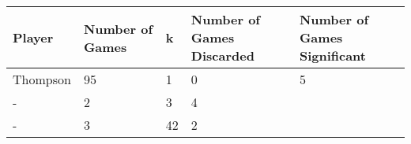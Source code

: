 \documentclass[11pt]{article}
\begin{document}
\begin{longtable}[]{@{}lllll@{}}
\toprule
\begin{minipage}[b]{0.05\columnwidth}\raggedright\strut
Player\strut
\end{minipage} & \begin{minipage}[b]{0.05\columnwidth}\raggedright\strut
Number of Games\strut
\end{minipage} & \begin{minipage}[b]{0.05\columnwidth}\raggedright\strut
k\strut
\end{minipage} & \begin{minipage}[b]{0.05\columnwidth}\raggedright\strut
Number of Games Discarded\strut
\end{minipage} & \begin{minipage}[b]{0.05\columnwidth}\raggedright\strut
Number of Games Significant\strut
\end{minipage}\tabularnewline
\midrule
\endhead
\begin{minipage}[t]{0.05\columnwidth}\raggedright\strut
Thompson\strut
\end{minipage} & \begin{minipage}[t]{0.05\columnwidth}\raggedright\strut
95\strut
\end{minipage} & \begin{minipage}[t]{0.05\columnwidth}\raggedright\strut
1\strut
\end{minipage} & \begin{minipage}[t]{0.05\columnwidth}\raggedright\strut
0\strut
\end{minipage} & \begin{minipage}[t]{0.05\columnwidth}\raggedright\strut
5\strut
\end{minipage}\tabularnewline
\begin{minipage}[t]{0.05\columnwidth}\raggedright\strut
-\strut
\end{minipage} & \begin{minipage}[t]{0.05\columnwidth}\raggedright\strut
2\strut
\end{minipage} & \begin{minipage}[t]{0.05\columnwidth}\raggedright\strut
3\strut
\end{minipage} & \begin{minipage}[t]{0.05\columnwidth}\raggedright\strut
4\strut
\end{minipage}\tabularnewline
\begin{minipage}[t]{0.05\columnwidth}\raggedright\strut
-\strut
\end{minipage} & \begin{minipage}[t]{0.05\columnwidth}\raggedright\strut
3\strut
\end{minipage} & \begin{minipage}[t]{0.05\columnwidth}\raggedright\strut
42\strut
\end{minipage} & \begin{minipage}[t]{0.05\columnwidth}\raggedright\strut
2\strut
\end{minipage}\tabularnewline
\bottomrule
\end{longtable}
\end{document}
